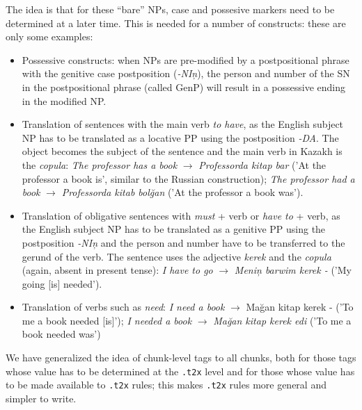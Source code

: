 \documentclass{article}
\begin{document}
The idea is that for these ``bare'' NPs, case and possesive markers need to be determined at a later time. This is needed for a number of constructs: these are only some examples:
\begin{itemize}
\item Possessive constructs: when NPs are pre-modified by a postpositional phrase with the genitive case postposition (\emph{-NI\c{n}}), the person and number of the SN in the postpositional phrase (called \(\mathrm{GenP}\)) will result in a possessive ending in the modified NP.
\item Translation of sentences with the main verb \emph{to have}, as the English subject NP has to be translated as a locative PP using the postposition \emph{-DA}. The object becomes the subject of the sentence and the main verb in Kazakh is the \emph{copula}:
\emph{The professor has a book} \(\to\) \emph{Professorda kitap bar} ('At the professor a book is',  similar to the Russian construction); \emph{The professor had a book} \(\to\) \emph{Professorda kitab bol\u{g}an} ('At the professor a book was').
\item Translation of obligative sentences with \emph{must} + verb or \emph{have to} + verb, as the English subject NP has to be translated as a genitive PP using the postposition \emph{-NI\c{n}} and the person and  number have to be transferred to the gerund of the verb. The sentence uses the adjective \emph{kerek} and the \emph{copula} (again, absent in present tense):
\emph{I have to go} \(\to\) \emph{Meni\c{n} barwim kerek -} ('My going [is] needed').
\item Translation of verbs such as \emph{need}: \emph{I need a book} \(\to\) {Ma\u{g}an kitap kerek -} ('To me a book needed [is]'); \emph{I needed a book} \(\to\) \emph{Ma\u{g}an kitap kerek edi} ('To me a book needed was')
\end{itemize}
We have generalized the idea of chunk-level tags to all chunks, both for those tags whose value has to be determined at the \texttt{.t2x} level and for those whose value has to be made available to \texttt{.t2x} rules; this makes \texttt{.t2x} rules more general and simpler to write.
\end{document}

